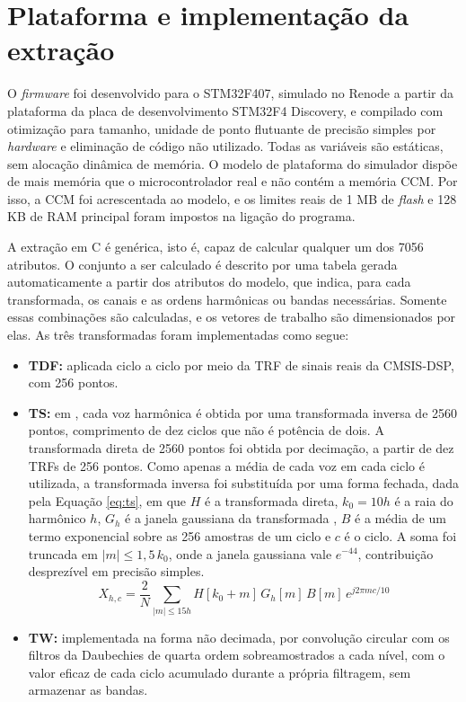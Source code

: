 \documentclass[
	12pt,				%
	openright,			%
	oneside,			%
	a4paper,			%
	english,			%
	brazil,				%
	]{abntex2}
\begin{document}
\section{Plataforma e implementação da extração}
\label{sec:implementacao}
O \textit{firmware} foi desenvolvido para o STM32F407, simulado no Renode a partir da plataforma da placa de desenvolvimento STM32F4 Discovery, e compilado com otimização para tamanho, unidade de ponto flutuante de precisão simples por \textit{hardware} e eliminação de código não utilizado. Todas as variáveis são estáticas, sem alocação dinâmica de memória. O modelo de plataforma do simulador dispõe de mais memória que o microcontrolador real e não contém a memória CCM. Por isso, a CCM foi acrescentada ao modelo, e os limites reais de 1 MB de \textit{flash} e 128 KB de RAM principal foram impostos na ligação do programa.

A extração em C é genérica, isto é, capaz de calcular qualquer um dos 7056 atributos. O conjunto a ser calculado é descrito por uma tabela gerada automaticamente a partir dos atributos do modelo, que indica, para cada transformada, os canais e as ordens harmônicas ou bandas necessárias. Somente essas combinações são calculadas, e os vetores de trabalho são dimensionados por elas. As três transformadas foram implementadas como segue:

\begin{itemize}
    \item \textbf{TDF:} aplicada ciclo a ciclo por meio da TRF de sinais reais da CMSIS-DSP, com 256 pontos.

    \item \textbf{TS:} em , cada voz harmônica é obtida por uma transformada inversa de 2560 pontos, comprimento de dez ciclos que não é potência de dois. A transformada direta de 2560 pontos foi obtida por decimação, a partir de dez TRFs de 256 pontos. Como apenas a média de cada voz em cada ciclo é utilizada, a transformada inversa foi substituída por uma forma fechada, dada pela Equação \eqref{eq:ts}, em que $H$ é a transformada direta, $k_0 = 10h$ é a raia do harmônico $h$, $G_h$ é a janela gaussiana da transformada \cite{[54]}, $B$ é a média de um termo exponencial sobre as 256 amostras de um ciclo e $c$ é o ciclo. A soma foi truncada em $|m| \leq 1{,}5\,k_0$, onde a janela gaussiana vale $e^{-44}$, contribuição desprezível em precisão simples.
    \begin{equation}
        X_{h,c} = \frac{2}{N} \sum_{|m| \leq 15h} H[k_0 + m]\, G_h[m]\, B[m]\, e^{j 2\pi m c / 10}
        \label{eq:ts}
    \end{equation}

    \item \textbf{TW:} implementada na forma não decimada, por convolução circular com os filtros da Daubechies de quarta ordem sobreamostrados a cada nível, com o valor eficaz de cada ciclo acumulado durante a própria filtragem, sem armazenar as bandas.
\end{itemize}
\end{document}
